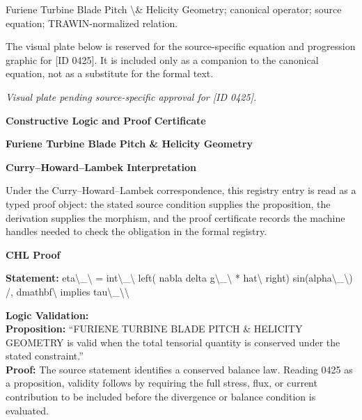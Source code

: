 Furiene Turbine Blade Pitch \textbackslash{}\& Helicity Geometry; canonical operator; source equation; TRAWIN-normalized relation.
\endgroup

\begingroup\footnotesize\sloppy
The visual plate below is reserved for the source-specific equation and progression graphic for [ID 0425]. It is included only as a companion to the canonical equation, not as a substitute for the formal text.
\par\endgroup
\begingroup\footnotesize\itshape
Visual plate pending source-specific approval for [ID 0425].
\par\endgroup

\clearpage
\begingroup\tzpsupportsetup
\noindent\textbf{\fontsize{10.8pt}{12.8pt}\selectfont [ID 0425] Constructive Logic and Proof Certificate}\par
\noindent\textbf{\fontsize{10pt}{12pt}\selectfont Furiene Turbine Blade Pitch \& Helicity Geometry}\par
\vspace{0.45em}
\begingroup
\footnotesize
\setlength{\parskip}{0.22em}
\setlength{\parindent}{0pt}
\noindent\textbf{Curry--Howard--Lambek Interpretation}\par
Under the Curry--Howard--Lambek correspondence, this registry entry is read as a typed proof
object: the stated source condition supplies the proposition, the derivation supplies the
morphism, and the proof certificate records the machine handles needed to check the obligation
in the formal registry.

\vspace{0.45em}
\noindent\textbf{CHL Proof}\par
\textbf{Statement:} eta\textbackslash{}\_\textbackslash{} = int\textbackslash{}\_\textbackslash{} left( nabla delta g\textbackslash{}\_\textbackslash{} * hat\textbackslash{} right) sin(alpha\textbackslash{}\_\textbackslash{}) /, dmathbf\textbackslash{} implies
tau\textbackslash{}\_\textbackslash{}\textbackslash{}

\textbf{Logic Validation:}\\
\textbf{Proposition:} ``FURIENE TURBINE BLADE PITCH \& HELICITY GEOMETRY is valid when the total tensorial
quantity is conserved under the stated constraint.''\\
\textbf{Proof:} The source statement identifies a conserved balance law. Reading 0425 as a proposition,
validity follows by requiring the full stress, flux, or current contribution to be
included before the divergence or balance condition is evaluated.

